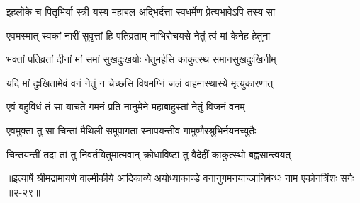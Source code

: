 \twolineshloka
{इहलोके च पितृभिर्या स्त्री यस्य महाबल}
{अद्भिर्दत्ता स्वधर्मेण प्रेत्यभावेऽपि तस्य सा} %

\twolineshloka
{एवमस्मात् स्वकां नारीं सुवृत्तां हि पतिव्रताम्}
{नाभिरोचयसे नेतुं त्वं मां केनेह हेतुना} %

\twolineshloka
{भक्तां पतिव्रतां दीनां मां समां सुखदुःखयोः}
{नेतुमर्हसि काकुत्स्थ समानसुखदुःखिनीम्} %

\twolineshloka
{यदि मां दुःखितामेवं वनं नेतुं न चेच्छसि}
{विषमग्निं जलं वाहमास्थास्ये मृत्युकारणात्} %

\twolineshloka
{एवं बहुविधं तं सा याचते गमनं प्रति}
{नानुमेने महाबाहुस्तां नेतुं विजनं वनम्} %

\twolineshloka
{एवमुक्ता तु सा चिन्तां मैथिली समुपागता}
{स्नापयन्तीव गामुष्णैरश्रुभिर्नयनच्युतैः} %

\twolineshloka
{चिन्तयन्तीं तदा तां तु निवर्तयितुमात्मवान्}
{क्रोधाविष्टां तु वैदेहीं काकुत्स्थो बह्वसान्त्वयत्} %


॥इत्यार्षे श्रीमद्रामायणे वाल्मीकीये आदिकाव्ये अयोध्याकाण्डे वनानुगमनयाच्ञानिर्बन्धः नाम एकोनत्रिंशः सर्गः ॥२-२९॥
